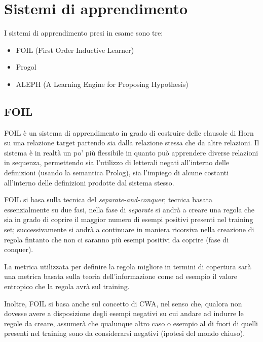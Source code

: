 \section{Sistemi di apprendimento}

I sistemi di apprendimento presi in esame sono tre:

\begin{itemize}
	\item FOIL (First Order Inductive Learner)
	\item Progol
	\item ALEPH (A Learning Engine for Proposing Hypothesis)
\end{itemize}

\subsection{FOIL}
\nocite{Quinlan:1993:FMR:645323.649599}
\nocite{foil}
\nocite{Quinlan90learninglogical}
FOIL è un sistema di apprendimento in grado di costruire delle clausole di Horn su una relazione target partendo sia dalla relazione stessa che da altre relazioni. Il sistema è in realtà un po' più flessibile in quanto può apprendere diverse relazioni in sequenza, permettendo sia l'utilizzo di letterali negati all'interno delle definizioni (usando la semantica Prolog), sia l'impiego di alcune costanti all'interno delle definizioni prodotte dal sistema stesso.

FOIL si basa sulla tecnica del \textit{separate-and-conquer}; tecnica basata essenzialmente su due fasi, nella fase di \textit{separate} si andrà a creare una regola che sia in grado di coprire il maggior numero di esempi positivi presenti nel training set; successivamente si andrà a continuare in maniera ricorsiva nella creazione di regola fintanto che non ci saranno più esempi positivi da coprire (fase di conquer).

La metrica utilizzata per definire la regola migliore in termini di copertura sarà una metrica basata sulla teoria dell'informazione come ad esempio il valore entropico che la regola avrà sul training.

Inoltre, FOIL si basa anche sul concetto di CWA, nel senso che, qualora non dovesse avere a disposizione degli esempi negativi su cui andare ad indurre le regole da creare, assumerà che qualunque altro caso o esempio al di fuori di quelli presenti nel training sono da considerarsi negativi (ipotesi del mondo chiuso).

